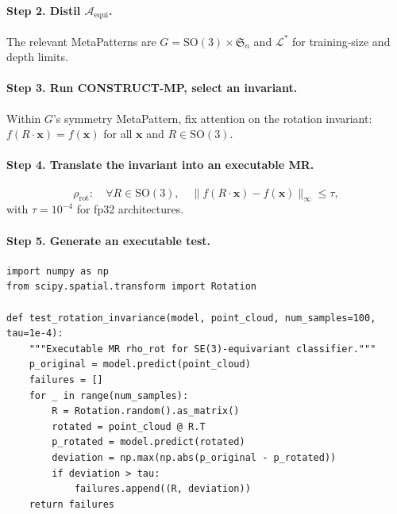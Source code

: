 \documentclass[acmsmall,screen,review]{acmart}
\begin{document}
\paragraph{Step 2. Distil $\mathcal{A}_{\mathrm{equi}}$.} The relevant MetaPatterns are $G = \mathrm{SO}(3)\times\mathfrak{S}_n$ and $\mathcal{L}^{*}$ for training-size and depth limits.

\paragraph{Step 3. Run CONSTRUCT-MP, select an invariant.} Within $G$'s symmetry MetaPattern, fix attention on the rotation invariant: $f(R \cdot \mathbf{x}) = f(\mathbf{x})$ for all $\mathbf{x}$ and $R \in \mathrm{SO}(3)$.

\paragraph{Step 4. Translate the invariant into an executable MR.}
\begin{equation}
\label{eq:rho-rot}
\rho_{\mathrm{rot}}: \quad \forall R \in \mathrm{SO}(3), \quad \big\| f(R \cdot \mathbf{x}) - f(\mathbf{x}) \big\|_\infty \le \tau,
\end{equation}
with $\tau = 10^{-4}$ for fp32 architectures.

\paragraph{Step 5. Generate an executable test.}
\begin{lstlisting}[style=pythonstyle, caption={Executable MR $\rho_{\mathrm{rot}}$ for SE(3)-equivariant classifier.}]
import numpy as np
from scipy.spatial.transform import Rotation

def test_rotation_invariance(model, point_cloud, num_samples=100, tau=1e-4):
    """Executable MR rho_rot for SE(3)-equivariant classifier."""
    p_original = model.predict(point_cloud)
    failures = []
    for _ in range(num_samples):
        R = Rotation.random().as_matrix()
        rotated = point_cloud @ R.T
        p_rotated = model.predict(rotated)
        deviation = np.max(np.abs(p_original - p_rotated))
        if deviation > tau:
            failures.append((R, deviation))
    return failures
\end{lstlisting}
\end{document}
